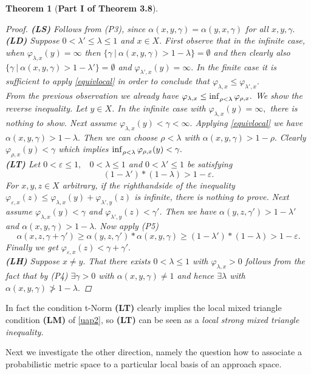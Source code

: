 \documentclass[12pt,a4paper]{amsart}
\theoremstyle{theorem}
\newtheorem{theorem}{Theorem}[section]
\theoremstyle{definition}
\renewcommand{\inf}{\myinf}
\DeclareMathOperator*{\myinf}{in\vphantom{p}f}
\renewcommand{\a}{\ensuremath{\alpha}}
\newcommand{\ve}{\ensuremath{\varepsilon}}
\renewcommand{\l}{\ensuremath{\lambda}}
\begin{document}
{\begin{theorem}[\bf Part I of Theorem 3.8]
\begin{proof}
{\bf{(LS)}} Follows from (P3), since $\a(x,y,\gamma) = \a(y,x,\gamma)$ for all $x,y,\gamma.$\\
{\bf(LD)} Suppose $0 < \l' \leq \l \leq 1$ and $x \in X.$ First observe that in the infinite case, when $\varphi_{\l,x} (y) = \infty$ then $\{ \gamma \ | \ \a(x,y,\gamma) > 1 - \l \} = \emptyset $ and then clearly also $\{ \gamma \ | \ \a(x,y,\gamma) > 1 - \l' \} = \emptyset $ and $\varphi_{\l',x} (y) = \infty.$
In the finite case  it is sufficient to apply \eqref{equivlocal} in order to conclude that $\varphi_{\l,x}  \leq  \varphi_{\l',x}.$\\
From the previous observation we already have $\varphi_{\l,x} \leq \inf _{\rho < \l} \varphi_{\rho,x}.$
We show the reverse inequality. Let $y \in X$. In the infinite case with $\varphi _{\l, x} (y) = \infty,$ there is nothing to show.
Next assume $\varphi_{\l, x} (y) <  \gamma < \infty.$ Applying \eqref{equivlocal} we have $\a(x,y,\gamma) > 1 - \l.$ Then we can choose $\rho < \l$ with 
$\a(x,y,\gamma) > 1 - \rho.$ Clearly $\varphi_{\rho,x} (y) < \gamma$ which implies $ \inf _{\rho < \l} \varphi_{\rho,x}(y) < \gamma.$\\
{\bf(LT)} 
Let $0 < \ve \leq 1,$ \  $0 < \l \leq 1$ and $0 < \l' \leq 1$ be satisfying
$$ (1 - \l') * ( 1 - \l) > 1 - \ve.$$ 
For $x,y,z \in X$ arbitrary,
if the righthandside of the inequality $\varphi_{\ve,x} (z) \leq \varphi _{\l, x} (y) + \varphi _{\l', y} (z)$ is infinite, there is nothing to prove. Next assume $\varphi _{\l, x} (y) < \gamma$ and  $\varphi _{\l', y} (z) < \gamma'$. Then we have $\a(y,z, \gamma') > 1 - \l'$ and $\a(x,y, \gamma) > 1 - \l.$
Now apply (P5)
$$
\a(x,z,\gamma + \gamma') \geq \a(y,z, \gamma')  * \a(x,y, \gamma) \geq (1 - \l') * ( 1 - \l)  > 1-\ve.
$$
Finally we get $\varphi_{\ve,x} (z) < \gamma + \gamma'.$\\
{\bf(LH)} 
Suppose $x \not = y.$ That there exists $0 < \l \leq 1$ with $\varphi_{ \l,x} > 0$ follows from the fact that by (P4) $\exists \gamma > 0$ with $\a(x,y,\gamma) \not = 1$ and hence $\exists \l$ with $\a(x,y,\gamma )\not  > 1 - \l.$
\end{proof}
\end{theorem}


In fact the condition t-Norm {\bf(LT)} clearly implies the local mixed triangle condition {\bf(LM)} of \ref{uap2}, so {\bf(LT)} can be seen as a \emph{local strong mixed triangle inequality.}

Next we investigate the other direction, namely the question how to associate a probabilistic metric space to a particular local basis of an approach space.

}
\end{document}
